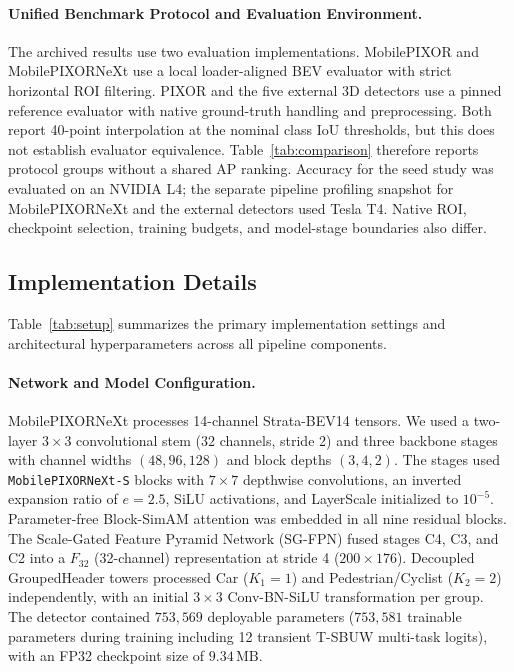 \paragraph{Unified Benchmark Protocol and Evaluation Environment.}
The archived results use two evaluation implementations. MobilePIXOR and MobilePIXORNeXt use a local loader-aligned BEV evaluator with strict horizontal ROI filtering. PIXOR and the five external 3D detectors use a pinned reference evaluator with native ground-truth handling and preprocessing. Both report 40-point interpolation at the nominal class IoU thresholds, but this does not establish evaluator equivalence. Table~\ref{tab:comparison} therefore reports protocol groups without a shared AP ranking. Accuracy for the seed study was evaluated on an NVIDIA L4; the separate pipeline profiling snapshot for MobilePIXORNeXt and the external detectors used Tesla T4. Native ROI, checkpoint selection, training budgets, and model-stage boundaries also differ.
\subsection{Implementation Details}
\label{sec:implementation_details}


Table~\ref{tab:setup} summarizes the primary implementation settings and architectural hyperparameters across all pipeline components.

\paragraph{Network and Model Configuration.}
MobilePIXORNeXt processes 14-channel Strata-BEV14 tensors. We used a two-layer $3 \times 3$ convolutional stem ($32$ channels, stride 2) and three backbone stages with channel widths $(48, 96, 128)$ and block depths $(3, 4, 2)$. The stages used \texttt{MobilePIXORNeXt-S} blocks with $7 \times 7$ depthwise convolutions, an inverted expansion ratio of $e=2.5$, SiLU activations, and LayerScale initialized to $10^{-5}$. Parameter-free Block-SimAM attention was embedded in all nine residual blocks. The Scale-Gated Feature Pyramid Network (SG-FPN) fused stages C4, C3, and C2 into a $F_{32}$ (32-channel) representation at stride 4 ($200 \times 176$). Decoupled GroupedHeader towers processed Car ($K_1=1$) and Pedestrian/Cyclist ($K_2=2$) independently, with an initial $3 \times 3$ Conv-BN-SiLU transformation per group. The detector contained $753{,}569$ deployable parameters ($753{,}581$ trainable parameters during training including 12 transient T-SBUW multi-task logits), with an FP32 checkpoint size of $9.34\,\text{MB}$.

